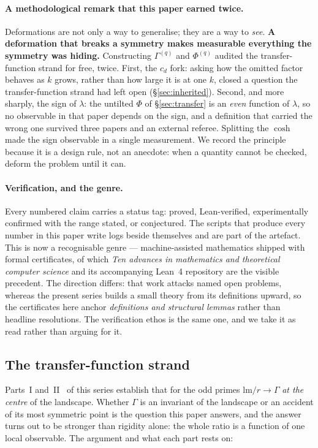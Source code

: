 \documentclass[11pt,a4paper]{article}
\theoremstyle{plain}
\theoremstyle{definition}
\theoremstyle{remark}
\newcommand{\lm}{\mathrm{lm}}
\begin{document}
\paragraph{A methodological remark that this paper earned twice.} Deformations are not only a
way to generalise; they are a way to \emph{see}. \textbf{A deformation that breaks a symmetry
makes measurable everything the symmetry was hiding.} Constructing $\Gamma^{(q)}$ and
$\Phi^{(q)}$ audited the transfer-function strand for free, twice. First, the $c_d$ fork: asking how the omitted
factor behaves as $k$ grows, rather than how large it is at one $k$, closed a question the transfer-function strand
had left open (\S\ref{sec:inherited}). Second, and more sharply, the sign of $\lambda$: the untilted
$\Phi$ of \S\ref{sec:transfer} is an \emph{even} function of $\lambda$, so no observable in that paper depends on
the sign, and a definition that carried the wrong one survived three papers and an external
referee. Splitting the $\cosh$ made the sign observable in a single measurement. We record the
principle because it is a design rule, not an anecdote: when a quantity cannot be checked,
deform the problem until it can.

\paragraph{Verification, and the genre.} Every numbered claim carries a status tag: proved,
Lean-verified, experimentally confirmed with the range stated, or conjectured. The scripts
that produce every number in this paper write logs beside themselves and are part of the
artefact. This is now a recognisable genre --- machine-assisted mathematics shipped with
formal certificates, of which \emph{Ten advances in mathematics and theoretical computer
science} \cite{TenProofs} and its accompanying Lean~4 repository are the visible precedent.
The direction differs: that work attacks named open problems, whereas the present series
builds a small theory from its definitions upward, so the certificates here anchor
\emph{definitions and structural lemmas} rather than headline resolutions. The verification
ethos is the same one, and we take it as read rather than arguing for it.

\subsection{The transfer-function strand}\label{sec:strand}

Parts~I and~II~\cite{P1,P2} of this series establish that for the odd primes
$\lm/r\to\Gamma$ \emph{at the centre} of the landscape. Whether $\Gamma$ is an invariant of
the landscape or an accident of its most symmetric point is the question this paper answers,
and the answer turns out to be stronger than rigidity alone: the whole ratio is a function of
one local observable. The argument and what each part rests on:
\end{document}
